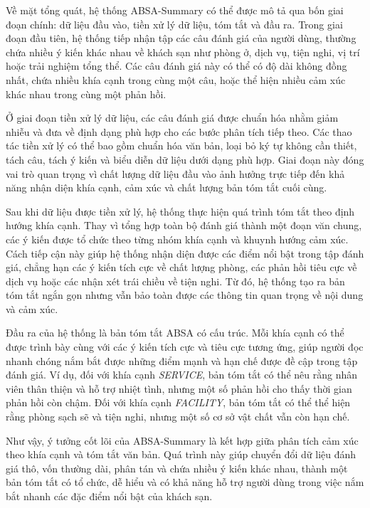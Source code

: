 Về mặt tổng quát, hệ thống ABSA-Summary có thể được mô tả qua bốn giai đoạn chính: dữ liệu đầu vào, tiền xử lý dữ liệu, tóm tắt và đầu ra. Trong giai đoạn đầu tiên, hệ thống tiếp nhận tập các câu đánh giá của người dùng, thường chứa nhiều ý kiến khác nhau về khách sạn như phòng ở, dịch vụ, tiện nghi, vị trí hoặc trải nghiệm tổng thể. Các câu đánh giá này có thể có độ dài không đồng nhất, chứa nhiều khía cạnh trong cùng một câu, hoặc thể hiện nhiều cảm xúc khác nhau trong cùng một phản hồi.

Ở giai đoạn tiền xử lý dữ liệu, các câu đánh giá được chuẩn hóa nhằm giảm nhiễu và đưa về định dạng phù hợp cho các bước phân tích tiếp theo. Các thao tác tiền xử lý có thể bao gồm chuẩn hóa văn bản, loại bỏ ký tự không cần thiết, tách câu, tách ý kiến và biểu diễn dữ liệu dưới dạng phù hợp. Giai đoạn này đóng vai trò quan trọng vì chất lượng dữ liệu đầu vào ảnh hưởng trực tiếp đến khả năng nhận diện khía cạnh, cảm xúc và chất lượng bản tóm tắt cuối cùng.

Sau khi dữ liệu được tiền xử lý, hệ thống thực hiện quá trình tóm tắt theo định hướng khía cạnh. Thay vì tổng hợp toàn bộ đánh giá thành một đoạn văn chung, các ý kiến được tổ chức theo từng nhóm khía cạnh và khuynh hướng cảm xúc. Cách tiếp cận này giúp hệ thống nhận diện được các điểm nổi bật trong tập đánh giá, chẳng hạn các ý kiến tích cực về chất lượng phòng, các phản hồi tiêu cực về dịch vụ hoặc các nhận xét trái chiều về tiện nghi. Từ đó, hệ thống tạo ra bản tóm tắt ngắn gọn nhưng vẫn bảo toàn được các thông tin quan trọng về nội dung và cảm xúc.

Đầu ra của hệ thống là bản tóm tắt ABSA có cấu trúc. Mỗi khía cạnh có thể được trình bày cùng với các ý kiến tích cực và tiêu cực tương ứng, giúp người đọc nhanh chóng nắm bắt được những điểm mạnh và hạn chế được đề cập trong tập đánh giá. Ví dụ, đối với khía cạnh \textit{SERVICE}, bản tóm tắt có thể nêu rằng nhân viên thân thiện và hỗ trợ nhiệt tình, nhưng một số phản hồi cho thấy thời gian phản hồi còn chậm. Đối với khía cạnh \textit{FACILITY}, bản tóm tắt có thể thể hiện rằng phòng sạch sẽ và tiện nghi, nhưng một số cơ sở vật chất vẫn còn hạn chế.

Như vậy, ý tưởng cốt lõi của ABSA-Summary là kết hợp giữa phân tích cảm xúc theo khía cạnh và tóm tắt văn bản. Quá trình này giúp chuyển đổi dữ liệu đánh giá thô, vốn thường dài, phân tán và chứa nhiều ý kiến khác nhau, thành một bản tóm tắt có tổ chức, dễ hiểu và có khả năng hỗ trợ người dùng trong việc nắm bắt nhanh các đặc điểm nổi bật của khách sạn.

